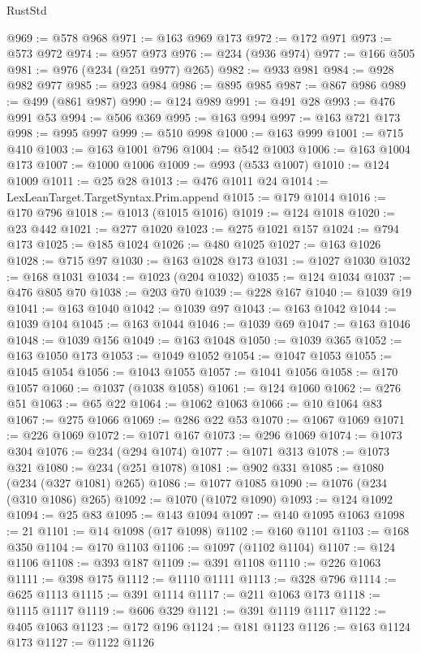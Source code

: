 \begin{lexlean}{RustStd}
\begin{coremodule}
@969 := @578 @968
@971 := @163 @969 @173
@972 := @172 @971
@973 := @573 @972
@974 := @957 @973
@976 := @234 (@936 @974)
@977 := @166 @505
@981 := @976 (@234 (@251 @977) @265)
@982 := @933 @981
@984 := @928 @982 @977
@985 := @923 @984
@986 := @895 @985
@987 := @867 @986
@989 := @499 (@861 @987)
@990 := @124 @989
@991 := @491 @28
@993 := @476 @991 @53
@994 := @506 @369
@995 := @163 @994
@997 := @163 @721 @173
@998 := @995 @997
@999 := @510 @998
@1000 := @163 @999
@1001 := @715 @410
@1003 := @163 @1001 @796
@1004 := @542 @1003
@1006 := @163 @1004 @173
@1007 := @1000 @1006
@1009 := @993 (@533 @1007)
@1010 := @124 @1009
@1011 := @25 @28
@1013 := @476 @1011 @24
@1014 := LexLeanTarget.TargetSyntax.Prim.append
@1015 := @179 @1014
@1016 := @170 @796
@1018 := @1013 (@1015 @1016)
@1019 := @124 @1018
@1020 := @23 @442
@1021 := @277 @1020
@1023 := @275 @1021 @157
@1024 := @794 @173
@1025 := @185 @1024
@1026 := @480 @1025
@1027 := @163 @1026
@1028 := @715 @97
@1030 := @163 @1028 @173
@1031 := @1027 @1030
@1032 := @168 @1031
@1034 := @1023 (@204 @1032)
@1035 := @124 @1034
@1037 := @476 @805 @70
@1038 := @203 @70
@1039 := @228 @167
@1040 := @1039 @19
@1041 := @163 @1040
@1042 := @1039 @97
@1043 := @163 @1042
@1044 := @1039 @104
@1045 := @163 @1044
@1046 := @1039 @69
@1047 := @163 @1046
@1048 := @1039 @156
@1049 := @163 @1048
@1050 := @1039 @365
@1052 := @163 @1050 @173
@1053 := @1049 @1052
@1054 := @1047 @1053
@1055 := @1045 @1054
@1056 := @1043 @1055
@1057 := @1041 @1056
@1058 := @170 @1057
@1060 := @1037 (@1038 @1058)
@1061 := @124 @1060
@1062 := @276 @51
@1063 := @65 @22
@1064 := @1062 @1063
@1066 := @10 @1064 @83
@1067 := @275 @1066
@1069 := @286 @22 @53
@1070 := @1067 @1069
@1071 := @226 @1069
@1072 := @1071 @167
@1073 := @296 @1069
@1074 := @1073 @304
@1076 := @234 (@294 @1074)
@1077 := @1071 @313
@1078 := @1073 @321
@1080 := @234 (@251 @1078)
@1081 := @902 @331
@1085 := @1080 (@234 (@327 @1081) @265)
@1086 := @1077 @1085
@1090 := @1076 (@234 (@310 @1086) @265)
@1092 := @1070 (@1072 @1090)
@1093 := @124 @1092
@1094 := @25 @83
@1095 := @143 @1094
@1097 := @140 @1095 @1063
@1098 := 21
@1101 := @14 @1098 (@17 @1098)
@1102 := @160 @1101
@1103 := @168 @350
@1104 := @170 @1103
@1106 := @1097 (@1102 @1104)
@1107 := @124 @1106
@1108 := @393 @187
@1109 := @391 @1108
@1110 := @226 @1063
@1111 := @398 @175
@1112 := @1110 @1111
@1113 := @328 @796
@1114 := @625 @1113
@1115 := @391 @1114
@1117 := @211 @1063 @173
@1118 := @1115 @1117
@1119 := @606 @329
@1121 := @391 @1119 @1117
@1122 := @405 @1063
@1123 := @172 @196
@1124 := @181 @1123
@1126 := @163 @1124 @173
@1127 := @1122 @1126

\end{coremodule}
\end{lexlean}
